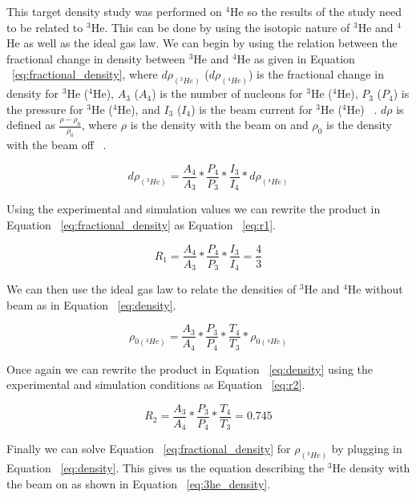 This target density study was performed on $^4$He so the results of the study need to be related to $^3$He. This can be done by using the isotopic nature of $^3$He and $^4$He as well as the ideal gas law. We can begin by using the relation between the fractional change in density between $^3$He and $^4$He as given in Equation ~\ref{eq:fractional_density}, where $d\rho_{\left(^3He\right)}$ ($d\rho_{\left(^4He\right)}$) is the fractional change in density for $^3$He ($^4$He), $A_3$ ($A_4$) is the number of nucleons for $^3$He ($^4$He), $P_3$ ($P_4$) is the pressure for $^3$He ($^4$He), and $I_3$ ($I_4$) is the beam current for $^3$He ($^4$He) ~\cite{density}. $d\rho$ is defined as $\frac{\rho-\rho_0}{\rho_0}$, where $\rho$ is the density with the beam on and $\rho_0$ is the density with the beam off ~\cite{density}. 

\begin{equation} \label{eq:fractional_density}
	d\rho_{\left(^3He\right)} = \frac{A_4}{A_3} * \frac{P_4}{P_3} * \frac{I_3}{I_4} * d\rho_{\left(^4He\right)}
\end{equation}

Using the experimental and simulation values we can rewrite the product in Equation ~\ref{eq:fractional_density} as Equation ~\ref{eq:r1}.

\begin{equation} \label{eq:r1}
	R_1 = \frac{A_4}{A_3} * \frac{P_4}{P_3} * \frac{I_3}{I_4} = \frac{4}{3}
\end{equation}

\noindent We can then use the ideal gas law to relate the densities of $^3$He and $^4$He without beam as in Equation ~\ref{eq:density}.

\begin{equation} \label{eq:density}
	\rho_{0\left(^3He\right)} = \frac{A_3}{A_4} * \frac{P_3}{P_4} * \frac{T_4}{T_3} * \rho_{0\left(^4He\right)}
\end{equation}

\noindent Once again we can rewrite the product in Equation ~\ref{eq:density} using the experimental and simulation conditions as Equation ~\ref{eq:r2}.

\begin{equation} \label{eq:r2}
	R_2 = \frac{A_3}{A_4} * \frac{P_3}{P_4} * \frac{T_4}{T_3} = 0.745
\end{equation}

Finally we can solve Equation ~\ref{eq:fractional_density} for $\rho_{\left(^3He\right)}$ by plugging in Equation ~\ref{eq:density}. This gives us the equation describing the $^3$He density with the beam on as shown in Equation ~\ref{eq:3he_density}.

